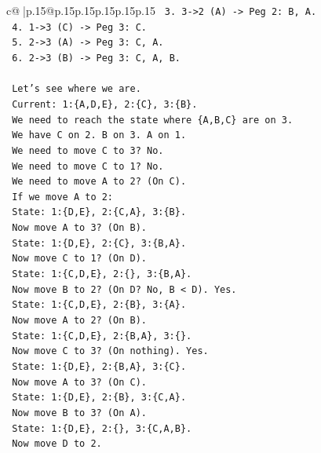 \documentclass{article}
\begin{document}
{\begin{supertabular}{c@{$\;$}|p{.15\linewidth}@{}p{.15\linewidth}p{.15\linewidth}p{.15\linewidth}p{.15\linewidth}p{.15\linewidth}}
{{{\texttt{        3. 3{-}>2 (A) {-}> Peg 2: B, A.} \\
\texttt{        4. 1{-}>3 (C) {-}> Peg 3: C.} \\
\texttt{        5. 2{-}>3 (A) {-}> Peg 3: C, A.} \\
\texttt{        6. 2{-}>3 (B) {-}> Peg 3: C, A, B.} \\
\\ 
\texttt{        Let's see where we are.} \\
\texttt{        Current: 1:\{A,D,E\}, 2:\{C\}, 3:\{B\}.} \\
\texttt{        We need to reach the state where \{A,B,C\} are on 3.} \\
\texttt{        We have C on 2. B on 3. A on 1.} \\
\texttt{        We need to move C to 3? No.} \\
\texttt{        We need to move C to 1? No.} \\
\texttt{        We need to move A to 2? (On C).} \\
\texttt{        If we move A to 2:} \\
\texttt{          State: 1:\{D,E\}, 2:\{C,A\}, 3:\{B\}.} \\
\texttt{          Now move A to 3? (On B).} \\
\texttt{          State: 1:\{D,E\}, 2:\{C\}, 3:\{B,A\}.} \\
\texttt{          Now move C to 1? (On D).} \\
\texttt{          State: 1:\{C,D,E\}, 2:\{\}, 3:\{B,A\}.} \\
\texttt{          Now move B to 2? (On D? No, B < D). Yes.} \\
\texttt{          State: 1:\{C,D,E\}, 2:\{B\}, 3:\{A\}.} \\
\texttt{          Now move A to 2? (On B).} \\
\texttt{          State: 1:\{C,D,E\}, 2:\{B,A\}, 3:\{\}.} \\
\texttt{          Now move C to 3? (On nothing). Yes.} \\
\texttt{          State: 1:\{D,E\}, 2:\{B,A\}, 3:\{C\}.} \\
\texttt{          Now move A to 3? (On C).} \\
\texttt{          State: 1:\{D,E\}, 2:\{B\}, 3:\{C,A\}.} \\
\texttt{          Now move B to 3? (On A).} \\
\texttt{          State: 1:\{D,E\}, 2:\{\}, 3:\{C,A,B\}.} \\
\texttt{          Now move D to 2.} \\
}}}
\end{supertabular}}
\end{document}
